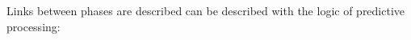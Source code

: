 



\noindent Links between phases are described can be described with the logic of predictive processing:


